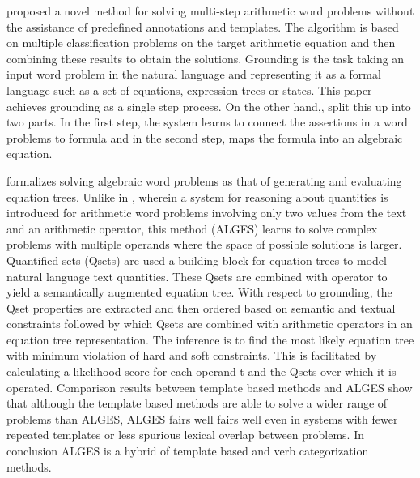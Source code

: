 \documentclass[11pt,letterpaper]{article}
\begin{document}
\cite{roy2016solving} proposed a novel method for solving multi-step arithmetic word problems without the assistance of predefined annotations and templates. The algorithm is based on multiple classification problems on the target arithmetic equation and then combining these results to obtain the solutions. Grounding is the task taking an input word problem in the natural language and representing it as a formal language such as a set of equations, expression trees or states. This paper achieves grounding as a single step process. On the other hand,\citep{mitra2016learning}, split this up into two parts. In the first step, the system learns to connect the assertions in a word problems to formula and in the second step, maps the formula into an algebraic equation.

\cite{KoncelKedziorski2015ParsingAW} formalizes solving algebraic word problems as that of generating and evaluating equation trees. Unlike in \cite{roy2017reasoning}, wherein a system for reasoning about quantities is introduced for arithmetic word problems involving only two values from the text and an arithmetic operator, this method (ALGES) learns to solve complex problems with multiple operands where the space of possible solutions is larger. Quantified sets (Qsets) are used a building block for equation trees to model natural language text quantities. These Qsets are combined with operator to yield a semantically augmented equation tree. With respect to grounding, the Qset properties are extracted and then ordered based on semantic and textual constraints followed by which Qsets are combined with arithmetic operators in an equation tree representation. The inference is to find the most likely equation tree with minimum violation of hard and soft constraints. This is facilitated by calculating a likelihood score for each operand t and the Qsets over which it is operated. Comparison results between template based methods and ALGES show that although the template based methods are able to solve a wider range of problems than ALGES, ALGES fairs well fairs well even in systems with fewer repeated templates or less spurious lexical overlap between problems. In conclusion ALGES is a hybrid of template based and verb categorization methods.
\end{document}
